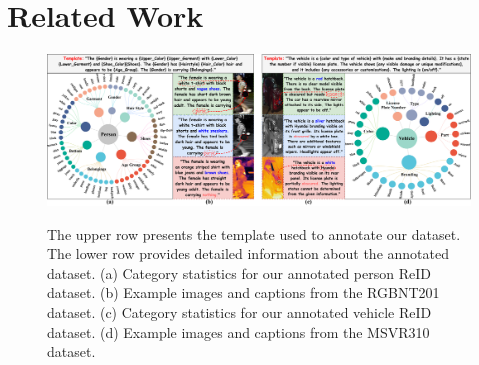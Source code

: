 \section{Related Work}
\label{sec:related}
\begin{figure}[t]
    \centering
      \resizebox{1.0\textwidth}{!}
      {
    \includegraphics[width=30\linewidth]{sec/img/Dataset_Example.pdf}
    }
    \vspace{-6mm}
     \caption{The upper row presents the template used to annotate our dataset.
     The lower row provides detailed information about the annotated dataset.
     (a) Category statistics for our annotated person ReID dataset.
     (b) Example images and captions from the RGBNT201 dataset.
     (c) Category statistics for our annotated vehicle ReID dataset.
     (d) Example images and captions from the MSVR310 dataset.}
    \label{fig:Dataset}
    \vspace{-2mm}
  \end{figure}

